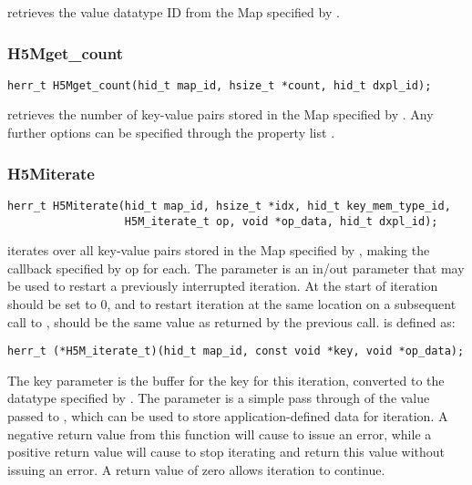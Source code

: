 \documentclass[../design_doc.tex]{subfiles}
\begin{document}
 retrieves the value datatype ID from the Map specified by .

\subsubsection{H5Mget\_count}

\begin{verbatim}
herr_t H5Mget_count(hid_t map_id, hsize_t *count, hid_t dxpl_id);
\end{verbatim}

 retrieves the number of key-value pairs stored in the Map specified by . Any further options can be specified through the property list .

\subsubsection{H5Miterate}

\begin{verbatim}
herr_t H5Miterate(hid_t map_id, hsize_t *idx, hid_t key_mem_type_id,
                  H5M_iterate_t op, void *op_data, hid_t dxpl_id);
\end{verbatim}

 iterates over all key-value pairs stored in the Map specified by , making the callback specified by op for each. The  parameter is an in/out parameter that may be used to restart a previously interrupted iteration. At the start of iteration  should be set to 0, and to restart iteration at the same location on a subsequent call to ,  should be the same value as returned by the previous call.
 is defined as:
\begin{verbatim}
herr_t (*H5M_iterate_t)(hid_t map_id, const void *key, void *op_data);
\end{verbatim}

The key parameter is the buffer for the key for this iteration, converted to the datatype specified by . The  parameter is a simple pass through of the value passed to , which can be used to store application-defined data for iteration. A negative return value from this function will cause  to issue an error, while a positive return value will cause  to stop iterating and return this value without issuing an error. A return value of zero allows iteration to continue.
\end{document}
